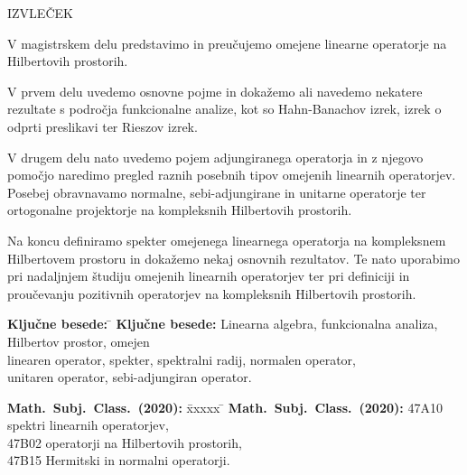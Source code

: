 \documentclass[12pt,a4paper,oneside,fleqn,openany]{book}
\begin{document}
\vspace{1.5cm}

\large

IZVLEČEK

\small

\vspace{1.5cm}
\begin{sloppypar}
V magistrskem delu predstavimo in preučujemo omejene linearne operatorje na Hilbertovih prostorih. 
\end{sloppypar}
\begin{sloppypar}
	V prvem delu uvedemo osnovne pojme in dokažemo ali navedemo nekatere rezultate s področja funkcionalne analize, kot so Hahn-Banachov izrek, izrek o odprti preslikavi ter Rieszov izrek. 
\end{sloppypar}
\begin{sloppypar}
	V drugem delu nato uvedemo pojem adjungiranega operatorja in z njegovo pomočjo naredimo pregled raznih posebnih tipov omejenih linearnih operatorjev. Posebej obravnavamo normalne, sebi-adjungirane in unitarne operatorje ter ortogonalne projektorje na kompleksnih Hilbertovih prostorih.
\end{sloppypar}
\begin{sloppypar}
Na koncu definiramo spekter omejenega linearnega operatorja na kompleksnem Hilbertovem prostoru in dokažemo nekaj osnovnih rezultatov. Te nato uporabimo pri nadaljnjem študiju omejenih linearnih operatorjev ter pri definiciji in proučevanju pozitivnih operatorjev na kompleksnih Hilbertovih prostorih.
\end{sloppypar}


\vfill

\begin{tabbing}
\textbf{Klju\v cne besede:} \=\kill
\textbf{Klju\v cne besede:} \>Linearna algebra, funkcionalna analiza, Hilbertov prostor, omejen \\
\> linearen operator, spekter, spektralni radij, normalen operator, \\
\>unitaren operator, sebi-adjungiran operator.
\end{tabbing}

\begin{tabbing}
\textbf{Math.\ Subj.\ Class.\ (2020):} \=xxxxx \=\kill
\textbf{Math.\ Subj.\ Class.\ (2020):} \>47A10 spektri linearnih operatorjev,\\
\> 47B02 operatorji na Hilbertovih prostorih,\\
\>47B15 Hermitski in normalni operatorji.\\
\end{tabbing}
\end{document}
